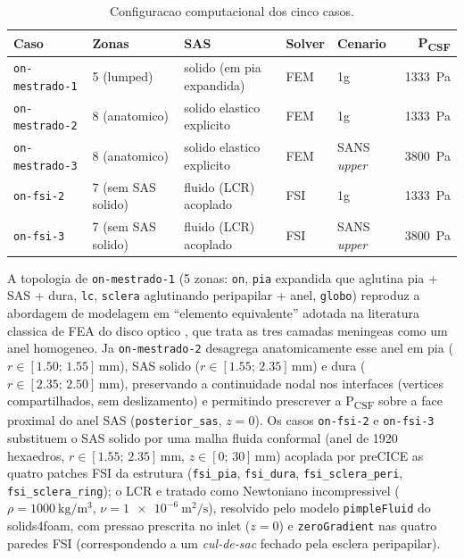 \begin{table}[h!]
\centering
\small
\caption{Configuracao computacional dos cinco casos.}
\label{tab:casos5}
\begin{tabular}{lllllr}
\toprule
\textbf{Caso} & \textbf{Zonas} & \textbf{SAS} & \textbf{Solver} & \textbf{Cenario} & \textbf{P\textsubscript{CSF}} \\
\midrule
\texttt{on-mestrado-1} & 5 (lumped)    & solido (em pia expandida) & FEM      & 1g                & \SI{1333}{\pascal} \\
\texttt{on-mestrado-2} & 8 (anatomico) & solido elastico explicito & FEM      & 1g                & \SI{1333}{\pascal} \\
\texttt{on-mestrado-3} & 8 (anatomico) & solido elastico explicito & FEM      & SANS \emph{upper} & \SI{3800}{\pascal} \\
\texttt{on-fsi-2}      & 7 (sem SAS solido) & fluido (LCR) acoplado & FSI    & 1g                & \SI{1333}{\pascal} \\
\texttt{on-fsi-3}      & 7 (sem SAS solido) & fluido (LCR) acoplado & FSI    & SANS \emph{upper} & \SI{3800}{\pascal} \\
\bottomrule
\end{tabular}
\end{table}

A topologia de \texttt{on-mestrado-1} (5 zonas: \texttt{on}, \texttt{pia} expandida que aglutina pia + SAS + dura, \texttt{lc}, \texttt{sclera} aglutinando peripapilar + anel, \texttt{globo}) reproduz a abordagem de modelagem em ``elemento equivalente'' adotada na literatura classica de FEA do disco optico \citep{Sigal2004}, que trata as tres camadas meningeas como um anel homogeneo. Ja \texttt{on-mestrado-2} desagrega anatomicamente esse anel em pia ($r \in [1.50;\, 1.55]\,\si{\milli\meter}$), SAS solido ($r \in [1.55;\, 2.35]\,\si{\milli\meter}$) e dura ($r \in [2.35;\, 2.50]\,\si{\milli\meter}$), preservando a continuidade nodal nos interfaces (vertices compartilhados, sem deslizamento) e permitindo prescrever a P\textsubscript{CSF} sobre a face proximal do anel SAS (\texttt{posterior\_sas}, $z = 0$). Os casos \texttt{on-fsi-2} e \texttt{on-fsi-3} substituem o SAS solido por uma malha fluida conformal (anel de \num{1920} hexaedros, $r \in [1.55;\, 2.35]\,\si{\milli\meter}$, $z \in [0;\, 30]\,\si{\milli\meter}$) acoplada por preCICE as quatro patches FSI da estrutura (\texttt{fsi\_pia}, \texttt{fsi\_dura}, \texttt{fsi\_sclera\_peri}, \texttt{fsi\_sclera\_ring}); o LCR e tratado como Newtoniano incompressivel ($\rho = \SI{1000}{\kilogram\per\meter\cubed}$, $\nu = \SI{1e-6}{\square\meter\per\second}$), resolvido pelo modelo \texttt{pimpleFluid} do solids4foam, com pressao prescrita no inlet ($z = 0$) e \texttt{zeroGradient} nas quatro paredes FSI (correspondendo a um \emph{cul-de-sac} fechado pela esclera peripapilar).

